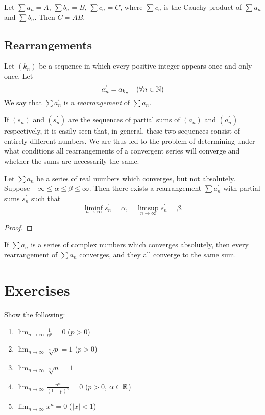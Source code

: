 \begin{proposition}
Let $\sum a_n=A$, $\sum b_n=B$, $\sum c_n=C$, where $\sum c_n$ is the Cauchy product of $\sum a_n$ and $\sum b_n$. Then $C=AB$.
\end{proposition}
\pagebreak

\subsection{Rearrangements}
\begin{definition}[Rearrangement]
Let $(k_n)$ be a sequence in which every positive integer appears once and only once. Let
\[a_n^\prime=a_{k_n}\quad(\forall n\in\mathbb N)\]
We say that $\sum a_n^\prime$ is a \emph{rearrangement} of $\sum a_n$.
\end{definition}

If $(s_n)$ and $(s_n^\prime)$ are the sequences of partial sums of $(a_n)$ and $(a_n^\prime)$ respectively, it is easily seen that, in general, these two sequences consist of entirely different numbers. We are thus led to the problem of determining under what conditions all rearrangements of a convergent series will converge and whether the sums are necessarily the same.

\begin{proposition}[Riemann]
Let $\sum a_n$ be a series of real numbers which converges, but not absolutely. Suppose $-\infty\le\alpha\le\beta\le\infty$. Then there exists a rearrangement $\sum a_n^\prime$ with partial sums $s_n^\prime$ such that
\[\liminf_{n\to\infty}s_n^\prime=\alpha,\quad\limsup_{n\to\infty}s_n^\prime=\beta.\]
\end{proposition}

\begin{proof}
\end{proof}

\begin{proposition}
If $\sum a_n$ is a series of complex numbers which converges absolutely, then every rearrangement of $\sum a_n$ converges, and they all converge to the same sum.
\end{proposition}
\pagebreak

\section*{Exercises}
\begin{exercise}
Show the following:
\begin{enumerate}[label=(\roman*)]
\item $\displaystyle\lim_{n\to\infty}\frac{1}{n^p}=0$ ($p>0$)
\item $\displaystyle\lim_{n\to\infty}\sqrt[n]{p}=1$ ($p>0$)
\item $\displaystyle\lim_{n\to\infty}\sqrt[n]{n}=1$
\item $\displaystyle\lim_{n\to\infty}\frac{n^\alpha}{(1+p)^n}=0$ ($p>0$, $\alpha\in\mathbb R$)
\item $\displaystyle\lim_{n\to\infty}x^n=0$ ($|x|<1$)
\end{enumerate}
\end{exercise}

